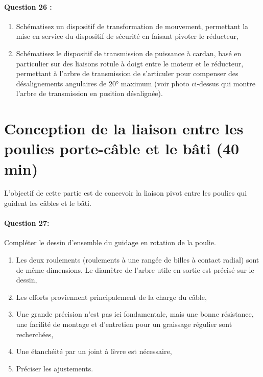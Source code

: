 \paragraph{Question 26 :}
\begin{enumerate}
 \item Schématisez un dispositif de transformation de mouvement, permettant la mise en service du dispositif de sécurité en faisant pivoter le réducteur,
 \item Schématisez le dispositif de transmission de puissance à cardan, basé en particulier sur des liaisons rotule à doigt entre le moteur et le réducteur, permettant à l'arbre de transmission de s'articuler pour compenser des désalignements angulaires de 20° maximum (voir photo ci-dessus qui montre l'arbre de transmission en position désalignée).
\end{enumerate}

\newpage

\section{Conception de la liaison entre les poulies porte-câble et le bâti (40 min)}

L'objectif de cette partie est de concevoir la liaison pivot entre les poulies qui guident les câbles et le bâti.

\paragraph{Question 27:} Compléter le dessin d'ensemble du guidage en rotation de la poulie.

\begin{enumerate}
 \item Les deux roulements (roulements à une rangée de billes à contact radial) sont de même dimensions. Le diamètre de l'arbre utile en sortie est précisé sur le dessin,
 \item Les efforts proviennent principalement de la charge du câble,
 \item Une grande précision n'est pas ici fondamentale, mais une bonne résistance, une facilité de montage et d'entretien pour un graissage régulier sont recherchées,
 \item Une étanchéité par un joint à lèvre est nécessaire,
 \item Préciser les ajustements.
\end{enumerate}



